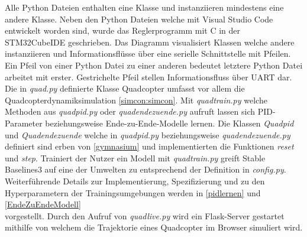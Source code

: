 \begin{center}
\end{center}
Alle Python Dateien enthalten eine Klasse und instanziieren mindestens eine andere Klasse. Neben den Python Dateien welche mit Visual Studio Code entwickelt worden sind, wurde das Reglerprogramm mit C in der STM32CubeIDE geschrieben.
Das Diagramm visualisiert Klassen welche andere instanziieren und Informationsflüsse über eine serielle Schnittstelle mit Pfeilen. Ein Pfeil von einer Python Datei zu einer anderen bedeutet letztere Python Datei arbeitet mit erster. Gestrichelte Pfeil stellen Informationsfluss über UART dar.\\
Die in \textit{quad.py} definierte Klasse Quadcopter umfasst vor allem die Quadcopterdynamiksimulation \ref{simcon:simcon}. Mit \textit{quadtrain.py} welche Methoden aus \textit{quadpid.py} oder \textit{quadendezuende.py} aufruft lassen sich PID-Parameter beziehungsweise Ende-zu-Ende-Modelle lernen. 
Die Klassen \textit{Quadpid} und \textit{Quadendezuende} welche in \textit{quadpid.py} beziehungsweise \textit{quadendezuende.py} definiert sind erben von  \ref{gymnasium} und implementierten die Funktionen \textit{reset} und \textit{step}. Trainiert der Nutzer ein Modell mit \textit{quadtrain.py} greift Stable Baselines3 auf eine der Umwelten zu entsprechend der Definition in \textit{config.py}. Weiterführende Details zur Implementierung, Spezifizierung und zu den Hyperparametern der Trainingsumgebungen werden in \ref{pidlernen} und \ref{EndeZuEndeModell}\\ vorgestellt. Durch den Aufruf von \textit{quadlive.py} wird ein Flask-Server gestartet mithilfe von welchem die Trajektorie eines Quadcopter im Browser simuliert wird. 
